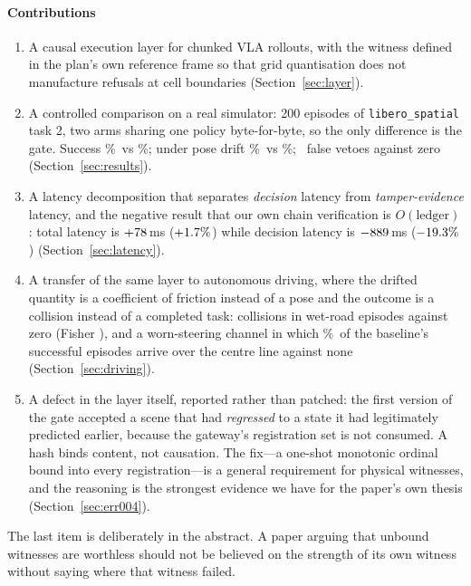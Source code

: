 \documentclass[conference]{IEEEtran}
\theoremstyle{definition}
\newcommand{\lib}{\texttt{libero\_spatial}}
\begin{document}
\paragraph{Contributions}
\begin{enumerate}
\item A causal execution layer for chunked VLA rollouts, with the witness
defined in the plan's own reference frame so that grid quantisation does not
manufacture refusals at cell boundaries
(Section~\ref{sec:layer}).
\item A controlled comparison on a real simulator: 200 episodes of \lib{} task
2, two arms sharing one policy byte-for-byte, so the only difference is the
gate. Success \SafeAll\%\ vs \CELAll\%; under pose drift
\SafePoseDrift\%\ vs \CELPoseDrift\%; \SafeFalseVetoes\ false vetoes against
zero (Section~\ref{sec:results}).
\item A latency decomposition that separates \emph{decision} latency from
\emph{tamper-evidence} latency, and the negative result that our own chain
verification is $O(\text{ledger})$: total latency is
$+78$\,ms ($+1.7\%$) while decision latency is
$-889$\,ms ($-19.3\%$) (Section~\ref{sec:latency}).
\item A transfer of the same layer to autonomous driving, where the drifted
quantity is a coefficient of friction instead of a pose and the outcome is a
collision instead of a completed task: \ADWetCollSafe{} collisions in
\ADWetN{} wet-road episodes against zero (Fisher \ADWetCollP), and a
worn-steering channel in which \ADLagPaintSafe\%\ of the baseline's successful
episodes arrive over the centre line against none
(Section~\ref{sec:driving}).
\item A defect in the layer itself, reported rather than patched: the first
version of the gate accepted a scene that had \emph{regressed} to a state it
had legitimately predicted earlier, because the gateway's registration set is
not consumed. A hash binds content, not causation. The fix---a one-shot
monotonic ordinal bound into every registration---is a general requirement for
physical witnesses, and the reasoning is the strongest evidence we have for the
paper's own thesis (Section~\ref{sec:err004}).
\end{enumerate}

The last item is deliberately in the abstract. A paper arguing that unbound
witnesses are worthless should not be believed on the strength of its own
witness without saying where that witness failed.
\end{document}
